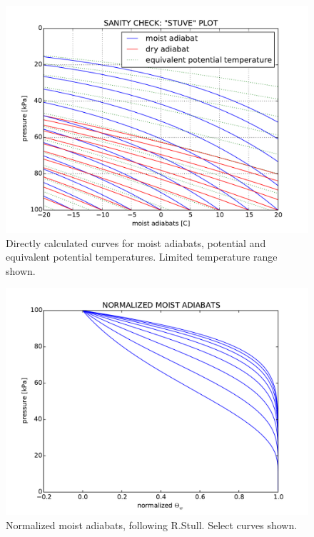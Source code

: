\documentclass{article}
\begin{document}
\begin{figure}
\centering
\includegraphics[width=4.5in]{../figs/stuve.pdf}
\caption{Directly calculated curves for moist adiabats, potential and equivalent potential temperatures. Limited temperature range shown. }\label{stuve}
\end{figure}

\begin{figure}
\centering
\includegraphics[width=4.5in]{../figs/norm_theta.pdf}
\caption{Normalized moist adiabats, following R.Stull. Select curves shown. }\label{norm_theta}
\end{figure}

\FloatBarrier
\end{document}
